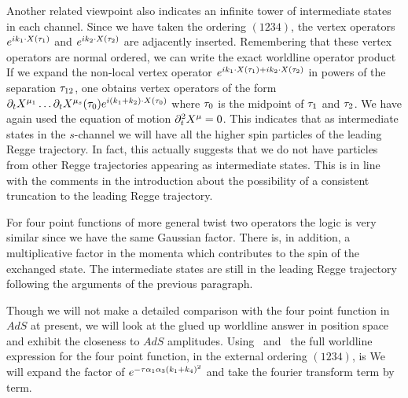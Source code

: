Another related viewpoint also indicates an infinite tower of intermediate states in each channel. 
Since we have taken the ordering $(1234)$, the vertex operators $e^{ik_1\cdot X({\tau}_1)}$
and $e^{ik_2\cdot X({\tau}_2)}$ are adjacently inserted. 
Remembering that these vertex operators
are normal ordered, we can write the exact 
worldline operator product
\eqn{}
If we expand the non-local vertex operator $e^{ik_1\cdot X({\tau}_1)+ik_2\cdot X({\tau}_2)}$
in powers of the separation ${\tau}_{12}$, one obtains vertex operators of the form
$\partial_tX^{\mu_1}\ldots\partial_tX^{\mu_s}({\tau}_0)e^{i(k_1+k_2)\cdot X({\tau}_0)}$ where ${\tau}_0$ is the midpoint
of ${\tau}_1$ and ${\tau}_2$. We have again used the equation of motion $\partial_t^2X^{\mu}=0$. 
This indicates that as intermediate states in the $s$-channel we will have all the
higher spin particles of the leading Regge trajectory. In fact, this actually suggests that we 
do not have particles 
from other Regge trajectories appearing as intermediate states. This is 
in line with the comments in the introduction about the possibility of a 
consistent truncation to the leading Regge trajectory. 

For four point functions of more general twist two operators the logic is very similar
since we have the same Gaussian factor. There is, in addition, a multiplicative factor
in the momenta which contributes to the spin of the exchanged state. The intermediate states
are still in the leading Regge trajectory following the arguments of the previous paragraph. 


Though we will not make a detailed comparison with the four point function in $AdS$ at present,
we will look at the glued up worldline answer in position space and exhibit the closeness 
to $AdS$ amplitudes. Using \wlint\ and \gaussfour\ 
the full worldline expression for the four point function, in the external ordering $(1234)$, is
\eqn{}
We will expand the factor of $e^{-{\tau}{\alpha}_1{\alpha}_3(k_1+k_4)^2}$ and take the fourier transform 
term by term. 

